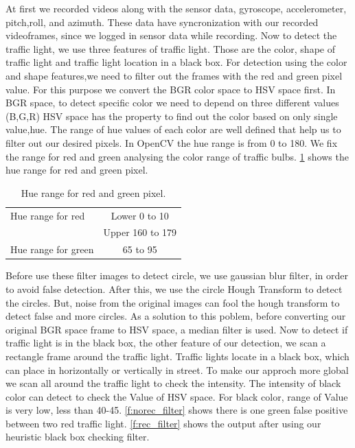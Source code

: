 At first we recorded videos along with the sensor data, gyroscope, accelerometer, pitch,roll, and azimuth.
These data have syncronization with our recorded videoframes, since we logged in sensor data while recording.
Now to detect the traffic light, we use three features of traffic light.
Those are the color, shape of traffic light and traffic light location in a black box.
For detection using the color and shape features,we need to filter out the frames with the red and green pixel value.
For this purpose we convert the BGR color space to HSV space first.
In BGR space, to detect specific color we need to depend on three different values (B,G,R)
HSV space has the property to find out the color based on only single value,hue.
The range of hue values of each color are well defined that help us to filter out our desired pixels.
In OpenCV the hue range is from 0 to 180.
We fix the range for red and green analysing the color range of traffic bulbs.
\ref{t:hue_range} shows the hue range for red and green pixel.

\begin{table}[h!]
  \centering
  \caption{Hue range for red and green pixel.}
  \label{t:hue_range}
  \begin{tabular}{  l | c  }
    \hline
    Hue range for red & Lower 0 to 10 \\ \cline{2-2}
    & Upper 160 to 179 \\
    \hline \hline
    Hue range for green & 65 to 95 \\
    \hline
  \end{tabular}
\end{table}

Before use these filter images to detect circle, we use gaussian blur filter, in order to avoid false detection.
After this, we use the circle Hough Transform \cite{hough_circle} to detect the circles.
But, noise from the original images can fool the hough transform to detect false and more circles.
As a solution to this poblem, before converting our original BGR space frame to HSV space, a median filter is used.
Now to detect if traffic light is in the black box, the other feature of our detection, we scan a rectangle frame  around the traffic light.
Traffic lights locate in a black box, which can place in horizontally or vertically in street.
To make our approch more global we scan all around the traffic light to check the intensity.
The intensity of black color can detect to check the Value of HSV space.
For black color, range of Value is very low, less than 40-45.
\ref{f:norec_filter} shows there is one green false positive between two red traffic light.
\ref{f:rec_filter} shows the output after using our heuristic black box checking filter.


